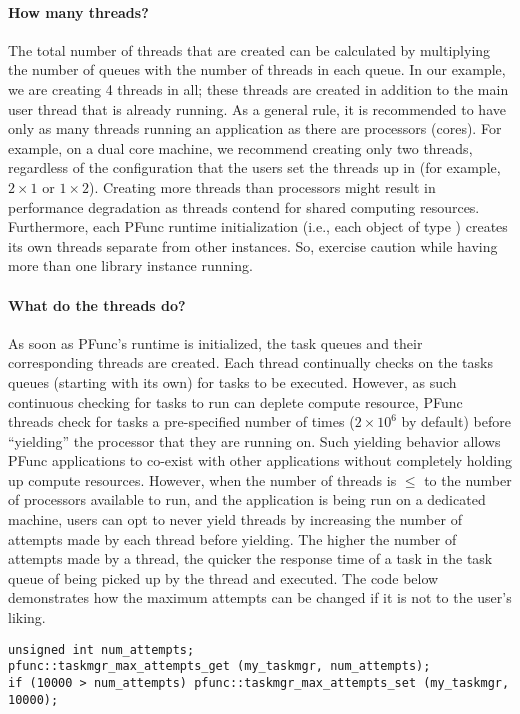 \paragraph{How many threads?} 
%
The total number of threads that are created can be calculated by multiplying
the number of queues with the number of threads in each queue. 
%
In our example, we are creating 4 threads in all; these threads are
created in addition to the main user thread that is already running. 
%
As a general rule, it is recommended to have only as many threads running an
application as there are processors (cores). 
%
For example, on a dual core machine, we recommend creating only two threads,
regardless of the configuration that the users set the threads up in (for
example, $2\times{}1$ or $1\times{}2$). 
%
Creating more threads than processors might result in performance degradation
as threads contend for shared computing resources. 
%
Furthermore, each PFunc runtime initialization (i.e., each object of type
) creates its own threads separate from other instances. 
%
So, exercise caution while having more than one library instance running.

\paragraph{What do the threads do?} As soon as PFunc's runtime is initialized,
the task queues and their corresponding threads are created. 
%
Each thread continually checks on the tasks queues (starting with its own) for
tasks to be executed.
%
However, as such continuous checking for tasks to run can deplete compute
resource, PFunc threads check for tasks a pre-specified number of times
($2\times10^{6}$ by default) before ``yielding'' the processor that they are
running on. 
%
Such yielding behavior allows PFunc applications to co-exist with other
applications without completely holding up compute resources. 
%
However, when the number of threads is $\le{}$ to the number of processors
available to run, and the application is being run on a dedicated machine,
users can opt to never yield threads by increasing the number of attempts made
by each thread before yielding. 
%
The higher the number of attempts made by a thread, the quicker the response
time of a task in the task queue of being picked up by the thread and executed. 
%
The code below demonstrates how the maximum attempts can be changed if it is
not to the user's liking. 
%
\begin{lstlisting}
unsigned int num_attempts;
pfunc::taskmgr_max_attempts_get (my_taskmgr, num_attempts);
if (10000 > num_attempts) pfunc::taskmgr_max_attempts_set (my_taskmgr, 10000);
\end{lstlisting}

